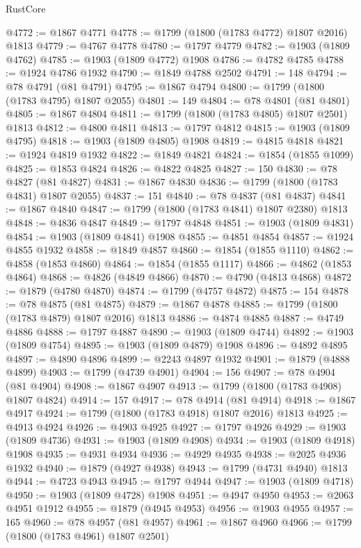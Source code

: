 \begin{lexlean}{RustCore}
\begin{coremodule}
@4772 := @1867 @4771
@4778 := @1799 (@1800 (@1783 @4772) @1807 @2016) @1813
@4779 := @4767 @4778
@4780 := @1797 @4779
@4782 := @1903 (@1809 @4762)
@4785 := @1903 (@1809 @4772) @1908
@4786 := @4782 @4785
@4788 := @1924 @4786 @1932
@4790 := @1849 @4788 @2502
@4791 := 148
@4794 := @78 @4791 (@81 @4791)
@4795 := @1867 @4794
@4800 := @1799 (@1800 (@1783 @4795) @1807 @2055)
@4801 := 149
@4804 := @78 @4801 (@81 @4801)
@4805 := @1867 @4804
@4811 := @1799 (@1800 (@1783 @4805) @1807 @2501) @1813
@4812 := @4800 @4811
@4813 := @1797 @4812
@4815 := @1903 (@1809 @4795)
@4818 := @1903 (@1809 @4805) @1908
@4819 := @4815 @4818
@4821 := @1924 @4819 @1932
@4822 := @1849 @4821
@4824 := @1854 (@1855 @1099)
@4825 := @1853 @4824
@4826 := @4822 @4825
@4827 := 150
@4830 := @78 @4827 (@81 @4827)
@4831 := @1867 @4830
@4836 := @1799 (@1800 (@1783 @4831) @1807 @2055)
@4837 := 151
@4840 := @78 @4837 (@81 @4837)
@4841 := @1867 @4840
@4847 := @1799 (@1800 (@1783 @4841) @1807 @2380) @1813
@4848 := @4836 @4847
@4849 := @1797 @4848
@4851 := @1903 (@1809 @4831)
@4854 := @1903 (@1809 @4841) @1908
@4855 := @4851 @4854
@4857 := @1924 @4855 @1932
@4858 := @1849 @4857
@4860 := @1854 (@1855 @1110)
@4862 := @4858 (@1853 @4860)
@4864 := @1854 (@1855 @1117)
@4866 := @4862 (@1853 @4864)
@4868 := @4826 (@4849 @4866)
@4870 := @4790 (@4813 @4868)
@4872 := @1879 (@4780 @4870)
@4874 := @1799 (@4757 @4872)
@4875 := 154
@4878 := @78 @4875 (@81 @4875)
@4879 := @1867 @4878
@4885 := @1799 (@1800 (@1783 @4879) @1807 @2016) @1813
@4886 := @4874 @4885
@4887 := @4749 @4886
@4888 := @1797 @4887
@4890 := @1903 (@1809 @4744)
@4892 := @1903 (@1809 @4754)
@4895 := @1903 (@1809 @4879) @1908
@4896 := @4892 @4895
@4897 := @4890 @4896
@4899 := @2243 @4897 @1932
@4901 := @1879 (@4888 @4899)
@4903 := @1799 (@4739 @4901)
@4904 := 156
@4907 := @78 @4904 (@81 @4904)
@4908 := @1867 @4907
@4913 := @1799 (@1800 (@1783 @4908) @1807 @4824)
@4914 := 157
@4917 := @78 @4914 (@81 @4914)
@4918 := @1867 @4917
@4924 := @1799 (@1800 (@1783 @4918) @1807 @2016) @1813
@4925 := @4913 @4924
@4926 := @4903 @4925
@4927 := @1797 @4926
@4929 := @1903 (@1809 @4736)
@4931 := @1903 (@1809 @4908)
@4934 := @1903 (@1809 @4918) @1908
@4935 := @4931 @4934
@4936 := @4929 @4935
@4938 := @2025 @4936 @1932
@4940 := @1879 (@4927 @4938)
@4943 := @1799 (@4731 @4940) @1813
@4944 := @4723 @4943
@4945 := @1797 @4944
@4947 := @1903 (@1809 @4718)
@4950 := @1903 (@1809 @4728) @1908
@4951 := @4947 @4950
@4953 := @2063 @4951 @1912
@4955 := @1879 (@4945 @4953)
@4956 := @1903 @4955
@4957 := 165
@4960 := @78 @4957 (@81 @4957)
@4961 := @1867 @4960
@4966 := @1799 (@1800 (@1783 @4961) @1807 @2501)

\end{coremodule}
\end{lexlean}
